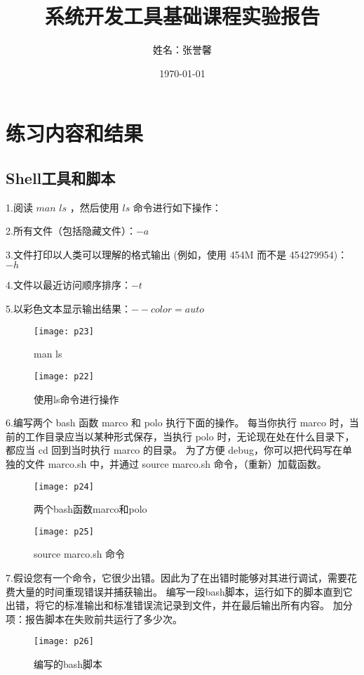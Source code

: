 \documentclass[a4paper ,12pt]{article}
\begin{document}
	
	\title{系统开发工具基础课程实验报告}
	\author{姓名：张誉馨}
	\date{\today}
	\maketitle
	
	\tableofcontents
	\newpage
	
	\section{练习内容和结果}
	
	\subsection{Shell工具和脚本}
	1.阅读 $man${ }$ls$ ，然后使用 $ls$ 命令进行如下操作：
	
	2.所有文件（包括隐藏文件）：$-a$
	
	3.文件打印以人类可以理解的格式输出 (例如，使用 454M 而不是 454279954)：$-h$
	
	4.文件以最近访问顺序排序：$-t$
	
	5.以彩色文本显示输出结果：$--color=auto$
	
	\begin{figure}[h]
		\centering
		\texttt{[image: p23]}
		\caption{man ls}
	\end{figure}
	
	\begin{figure}[h]
		\centering
		\texttt{[image: p22]}
		\caption{使用ls命令进行操作}
	\end{figure}
	
    6.编写两个 bash 函数 marco 和 polo 执行下面的操作。 每当你执行 marco 时，当前的工作目录应当以某种形式保存，当执行 polo 时，无论现在处在什么目录下，都应当 cd 回到当时执行 marco 的目录。 为了方便 debug，你可以把代码写在单独的文件 marco.sh 中，并通过 source marco.sh 命令，（重新）加载函数。
		\begin{figure}[h]
		\centering
		\texttt{[image: p24]}
		\caption{两个bash函数marco和polo}
	\end{figure}
	
		\begin{figure}[h]
		\centering
		\texttt{[image: p25]}
		\caption{source marco.sh 命令}
	\end{figure}
	
	7.假设您有一个命令，它很少出错。因此为了在出错时能够对其进行调试，需要花费大量的时间重现错误并捕获输出。 编写一段bash脚本，运行如下的脚本直到它出错，将它的标准输出和标准错误流记录到文件，并在最后输出所有内容。 加分项：报告脚本在失败前共运行了多少次。
    	\begin{figure}[h]
    	\centering
    	\texttt{[image: p26]}
    	\caption{编写的bash脚本}
    \end{figure}
	
\end{document}
